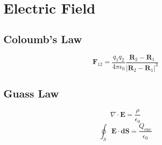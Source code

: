 \documentclass{article}
\begin{document}
    \section{Electric Field}

    \subsection{Coloumb's Law}
    \begin{definition}
        \begin{equation}
            \mathbf{F}_{12} = \frac{q_1 q_2}{4\pi\epsilon_0}\frac{\mathbf{R}_2 - \mathbf{R}_1}{|\mathbf{R}_2 - \mathbf{R}_1|^3}
        \end{equation}
    \end{definition}

    \subsection{Guass Law}
    \begin{definition}
        \begin{equation}
            \nabla \cdot \mathbf{E} = \frac{\rho}{\epsilon_0}
        \end{equation}
        \begin{equation}
            \oint_S \mathbf{E} \cdot \mathbf{dS} = \frac{Q_{\text{enc}}}{\epsilon_0}
        \end{equation}
    \end{definition}
\end{document}
